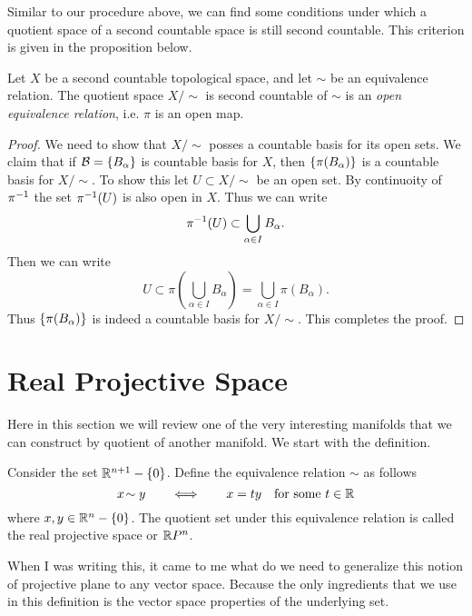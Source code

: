 Similar to our procedure above, we can find some conditions under which a quotient space of a second countable space is still second countable. This criterion is given in the proposition below.
\begin{proposition}
	\label{prop:secondCountalbeQuotientSpace}
	Let $ X $ be a second countable topological space, and let $ \sim $ be an equivalence relation. The quotient space $ X/\sim $ is second countable of $ \sim $ is an \emph{open equivalence relation}, i.e. $ \pi $ is an open map.
\end{proposition}
\begin{proof}
	We need to show that $ X/\sim $ posses a countable basis for its open sets. We claim that if $ \mathcal{B} = \{B_\alpha\} $ is countable basis for $ X $, then $ \{\pi(B_\alpha)\} $ is a countable basis for $ X/\sim $. To show this let $ U \subset X/\sim $ be an open set. By continuoity of $ \pi^{-1} $ the set $ \pi^{-1}(U) $ is also open in $ X $. Thus we can write
	\[ \pi^{-1}(U) \subset \bigcup_{\alpha \in I} B_\alpha. \] 
	Then we can write
	\[ U \subset \pi( \bigcup_{\alpha \in I} B_\alpha) = \bigcup_{\alpha\in I} \pi( B_\alpha). \]
	Thus $ \{\pi(B_\alpha)\} $ is indeed a countable basis for $ X/\sim $. This completes the proof.
\end{proof}

\section{Real Projective Space}
Here in this section we will review one of the very interesting manifolds that we can construct by quotient of another manifold. We start with the definition.

\begin{definition}
	Consider the set $ \mathbb{R}^{n+1} - \{0\} $. Define the equivalence relation $ \sim $ as follows
	\[ x \sim y \qquad \Longleftrightarrow\qquad x = ty \quad \text{for some $ t \in \R $} \]
	where $ x,y \in \mathbb{R}^n - \{0\} $. The quotient set under this equivalence relation is called the real projective space or $ \mathbb{R} P^n $.
\end{definition}

\begin{remark}
	When I was writing this, it came to me what do we need to generalize this notion of projective plane to any vector space. Because the only ingredients that we use in this definition is the vector space properties of the underlying set. 
\end{remark}

